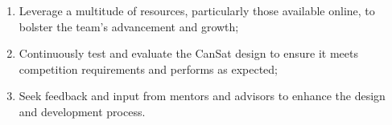 \begin{enumerate}[topsep=3pt]
    \item Leverage a multitude of resources, particularly those available online, to bolster the team's advancement and growth;
    \item Continuously test and evaluate the CanSat design to ensure it meets competition requirements and performs as expected;
    \item Seek feedback and input from mentors and advisors to enhance the design and development process.
\end{enumerate}

